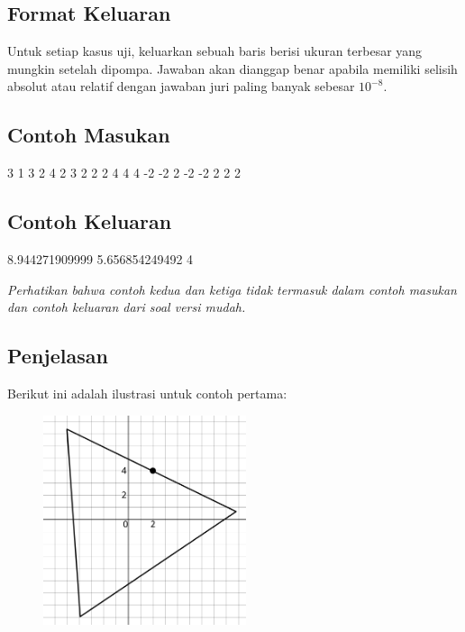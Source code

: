 \documentclass[../main_problemset.tex]{subfiles} %
\begin{document}
\subsection*{Format Keluaran}

Untuk setiap kasus uji, keluarkan sebuah baris berisi ukuran terbesar yang mungkin setelah dipompa. Jawaban akan dianggap benar apabila memiliki selisih absolut atau relatif dengan jawaban juri paling banyak sebesar $ 10^{-8} $.

\vspace{.4cm}

\begin{minipage}[t]{0.5\textwidth}
\subsection*{Contoh Masukan}

\begin{lcverbatim}
3
1 3
2 4
2 3
2 2
2 4
4 4
-2 -2
2 -2
-2 2
2 2
\end{lcverbatim}
\end{minipage}
\begin{minipage}[t]{0.5\textwidth}
\subsection*{Contoh Keluaran}

\begin{lcverbatim}
8.944271909999
5.656854249492
4
\end{lcverbatim}
\end{minipage}

\textit{Perhatikan bahwa contoh kedua dan ketiga tidak termasuk dalam contoh masukan dan contoh keluaran dari soal versi mudah.}

\subsection*{Penjelasan}

Berikut ini adalah ilustrasi untuk contoh pertama:

\begin{figure}[H]
	\centering
	\includegraphics[width=225px]{balon/asset/1}
\end{figure}
\end{document}

